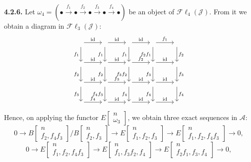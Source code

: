 \medskip\noindent\textbf{4.2.6.}
Let
$\omega_4=(\mathord\bullet\xrightarrow{f_1}\mathord\bullet
\xrightarrow{f_2}\mathord\bullet\xrightarrow{f_3}\mathord\bullet
\xrightarrow{f_4}\mathord\bullet)$
be an object of $\mathcal{F}\ell_4(\mathcal J)$. From it we obtain a
diagram in $\mathcal{F}\ell_3(\mathcal J)$:
\[
\begin{tikzcd}[column sep=2.6em,row sep=2.15em]
{}\arrow[r,"\mathrm{id}"]\arrow[d,"f_1"']&
{}\arrow[r,"\mathrm{id}"]\arrow[d,"f_1"']&
{}\arrow[r,"\mathrm{id}"]\arrow[d,"f_1"']&
{}\arrow[r,"f_1"]\arrow[d,"f_2f_1"']&
{}\arrow[d,"f_2"]\\
{}\arrow[r,"\mathrm{id}"]\arrow[d,"f_2"']&
{}\arrow[r,"\mathrm{id}"]\arrow[d,"f_2"']&
{}\arrow[r,"f_2"]\arrow[d,"f_3f_2"']&
{}\arrow[r,"\mathrm{id}"]\arrow[d,"f_3"']&
{}\arrow[d,"f_3"]\\
{}\arrow[r,"\mathrm{id}"]\arrow[d,"f_3"']&
{}\arrow[r,"f_3"]\arrow[d,"f_4f_3"']&
{}\arrow[r,"\mathrm{id}"]\arrow[d,"f_4"']&
{}\arrow[r,"\mathrm{id}"]\arrow[d,"f_4"']&
{}\arrow[d,"f_4"]\\
{}\arrow[r,"f_4"]&
{}\arrow[r,"\mathrm{id}"]&
{}\arrow[r,"\mathrm{id}"]&
{}\arrow[r,"\mathrm{id}"]&{}
\end{tikzcd}
\]
Hence, on applying the functor
$E\!\begin{bmatrix}n\\ \omega_3\end{bmatrix}$, we obtain three exact
sequences in $\mathcal A$:
\[
0\longrightarrow
B\!\begin{bmatrix}n\\ f_2,f_4f_3\end{bmatrix}
 \Big/
B\!\begin{bmatrix}n\\ f_2,f_3\end{bmatrix}
\longrightarrow
E\!\begin{bmatrix}n\\ f_1,f_2,f_3\end{bmatrix}
\longrightarrow
E\!\begin{bmatrix}n\\ f_1,f_2,f_4f_3\end{bmatrix}
\longrightarrow0,
\]
\[
0\longrightarrow
E\!\begin{bmatrix}n\\ f_1,f_2,f_4f_3\end{bmatrix}
\longrightarrow
E\!\begin{bmatrix}n\\ f_1,f_3f_2,f_4\end{bmatrix}
\longrightarrow
E\!\begin{bmatrix}n\\ f_2f_1,f_3,f_4\end{bmatrix}
\longrightarrow0,
\]
\endgroup
